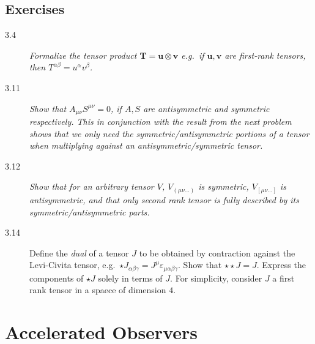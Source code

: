 \documentclass[12pt]{report}
\begin{document}
\begin{description}
\end{description}

\subsection{Exercises}

\begin{description}
    \item[3.4] \emph{Formalize the tensor product $\mathbf{T} = \mathbf{u}
        \otimes \mathbf{v}$ e.g.\ if $\mathbf{u}, \mathbf{v}$ are first-rank
        tensors, then $T^{\alpha\beta} = u^\alpha v^\beta$.}

    \item[3.11] \emph{Show that $A_{\mu\nu}S^{\mu\nu} = 0$, if $A,S$ are
        antisymmetric and symmetric respectively. This in conjunction with the
        result from the next problem shows that we only need the
        symmetric/antisymmetric portions of a tensor when multiplying against an
        antisymmetric/symmetric tensor.}

    \item[3.12] \emph{Show that for an arbitrary tensor $V$, $V_{(\mu\nu\dots)}$
        is symmetric, $V_{[\mu\nu\dots]}$ is antisymmetric, and that only second
        rank tensor is fully described by its symmetric/antisymmetric parts.}

    \item[3.14] Define the \emph{dual} of a tensor $J$ to be obtained by
        contraction against the Levi-Civita tensor, e.g.\
        ${\star J}_{\alpha\beta\gamma} =
        {J^\mu}\varepsilon_{\mu\alpha\beta\gamma}$.
        Show that $\star \star J = J$. Express the components of $\star J$
        solely in terms of $J$. For simplicity, consider $J$ a first rank tensor
        in a spaece of dimension $4$.
\end{description}

\section{Accelerated Observers}
\end{document}
